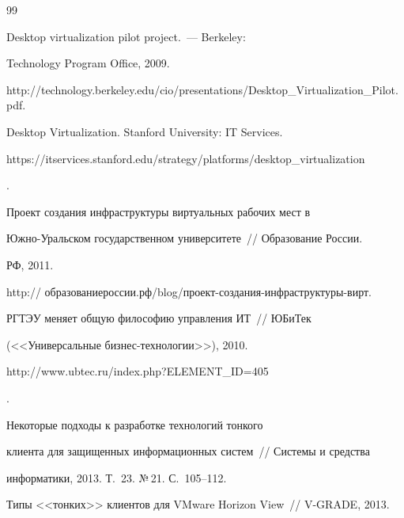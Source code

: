 {\small\frenchspacing

{%


\begin{thebibliography}{99}



\vspace*{-2pt}




 Desktop virtualization pilot project.~--- Berkeley: 

Technology Program Office, 2009. 

{\sf http://technology.berkeley.edu/cio/presentations/\linebreak Desktop\_Virtualization\_Pilot.pdf}.




Desktop Virtualization. Stanford University: IT Services. {\sf 

https://itservices.stanford.\linebreak edu/strategy/platforms/desktop\_virtualization}.


Проект создания инфраструктуры виртуальных рабочих мест в 

Юж\-но-Ураль\-ском государственном университете~/\!\!/ Образование России. 

РФ, 2011. 

{\sf http:// образованиероссии.рф/blog/проект-создания-инфраструктуры-вирт}.


РГТЭУ меняет общую философию управления ИТ~/\!\!/ ЮБиТек 

(<<Универсальные биз\-нес-тех\-но\-ло\-гии>>), 2010. {\sf 

http://www.ubtec.ru/index.php?ELEMENT\_ID=405}.


 Некоторые подходы к разработке технологий тонкого 

клиента для защищенных информационных систем~/\!\!/ Системы и средства 

информатики, 2013. Т.~23. №\,21. С.~105--112. 


Типы <<тонких>> клиентов для VMware Horizon View~/\!\!/ V-GRADE, 2013. 


\end{thebibliography}}}
